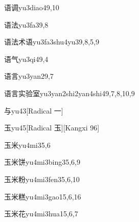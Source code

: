\begin{entry}{语调}{yu3diao4}{9,10}
\end{entry}

\begin{entry}{语法}{yu3fa3}{9,8}
\end{entry}

\begin{entry}{语法术语}{yu3fa3shu4yu3}{9,8,5,9}
\end{entry}

\begin{entry}{语气}{yu3qi4}{9,4}
\end{entry}

\begin{entry}{语言}{yu3yan2}{9,7}
\end{entry}

\begin{entry}{语言实验室}{yu3yan2shi2yan4shi4}{9,7,8,10,9}
\end{entry}

\begin{entry}{与}{yu4}{3}[Radical 一]
\end{entry}

\begin{entry}{玉}{yu4}{5}[Radical 玉][Kangxi 96]
\end{entry}

\begin{entry}{玉米}{yu4mi3}{5,6}
\end{entry}

\begin{entry}{玉米饼}{yu4mi3bing3}{5,6,9}
\end{entry}

\begin{entry}{玉米粉}{yu4mi3fen3}{5,6,10}
\end{entry}

\begin{entry}{玉米糕}{yu4mi3gao1}{5,6,16}
\end{entry}

\begin{entry}{玉米花}{yu4mi3hua1}{5,6,7}
\end{entry}

